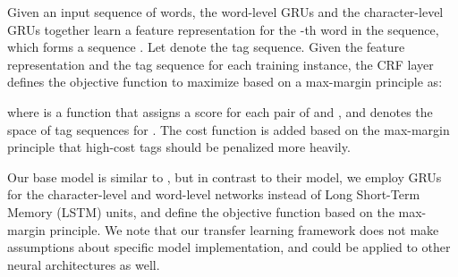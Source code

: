\documentclass{article} \usepackage{iclr2017_conference,times}
\begin{document}
Given an input sequence of words, the word-level GRUs and the character-level GRUs together learn a feature representation  for the -th word in the sequence, which forms a sequence . Let  denote the tag sequence. Given the feature representation  and the tag sequence  for each training instance, the CRF layer defines the objective function to maximize based on a max-margin principle \citep{gimpel2010softmax} as:

where  is a function that assigns a score for each pair of  and , and  denotes the space of tag sequences for . The cost function  is added based on the max-margin principle \citep{gimpel2010softmax} that high-cost tags  should be penalized more heavily.

Our base model is similar to \cite{lample2016neural}, but in contrast to their model, we employ GRUs for the character-level and word-level networks instead of Long Short-Term Memory (LSTM) units, and define the objective function based on the max-margin principle. We note that our transfer learning framework does not make assumptions about specific model implementation, and could be applied to other neural architectures \citep{collobert2011natural,chiu2015named,lample2016neural,ma2016end} as well.
\end{document}
